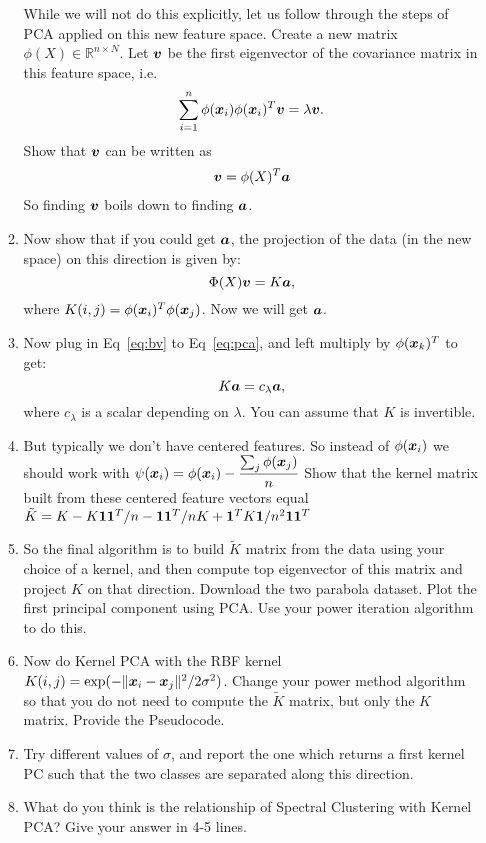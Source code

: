 \documentclass[11pt]{article}
\begin{document}
\begin{enumerate}
\begin{enumerate}
While we will not do this explicitly, let us follow through the steps of PCA applied on this new feature space. Create a new matrix $\phi(X)\in\mathbb{R}^{n\times N}$. Let $\boldsymbol{v}$ be the first eigenvector of the covariance matrix in this feature space, i.e.
\begin{align}
\label{eq:pca}
\sum_{i=1}^n\phi(\boldsymbol{x}_i)\phi(\boldsymbol{x}_i)^T\boldsymbol{v}=\lambda \boldsymbol{v}.
\end{align}
 Show that $\boldsymbol{v}$ can be written as 
\begin{align}\label{eq:bv}
\boldsymbol{v}=\phi(X)^T\boldsymbol{a}
\end{align}
So finding $\boldsymbol{v}$ boils down to finding $\boldsymbol{a}$. 
\item Now show that if you could get $\boldsymbol{a}$, the projection of the data (in the new space) on this direction is given by:
$$\Phi(X)\boldsymbol{v}=K\boldsymbol{a},$$
where $K(i,j)=\phi(\boldsymbol{x}_i)^T\phi(\boldsymbol{x}_j)$. Now we will get $\boldsymbol{a}$.
\item Now plug in Eq~\eqref{eq:bv} to Eq~\eqref{eq:pca}, and left multiply by $\phi(\boldsymbol{x}_k)^T$ to get:
$$K\boldsymbol{a}=c_\lambda \boldsymbol{a},$$
where $c_\lambda$ is a scalar depending on $\lambda$.
You can assume that $K$ is invertible.
\item But typically we don't have centered features. So instead of $\phi(\boldsymbol{x}_i)$ we should work with $\psi(\boldsymbol{x}_i)=\phi(\boldsymbol{x}_i)-\dfrac{\sum_j \phi(\boldsymbol{x}_j)}{n}$
Show that the kernel matrix built from these centered feature vectors equal $\tilde{K}=K-K\boldsymbol{1}\boldsymbol{1}^T/n-\boldsymbol{1}\boldsymbol{1}^T/nK+\boldsymbol{1}^TK\boldsymbol{1}/n^2\boldsymbol{1}\boldsymbol{1}^T$
\item So the final algorithm is to build $\tilde{K}$ matrix from the data using your choice of a kernel, and then compute top eigenvector of this matrix and project $K$ on that direction. Download the two parabola dataset. Plot the first principal component using PCA. Use your power iteration algorithm to do this.
\item Now do Kernel PCA with the RBF kernel $K(i,j)=\exp(-\|\boldsymbol{x}_i-\boldsymbol{x}_j\|^2/2\sigma^2)$. Change your power method algorithm so that you do not need to compute the $\tilde{K}$ matrix, but only the $K$ matrix. Provide the Pseudocode.
\item Try different values of $\sigma$, and report the one which returns a first kernel PC such that the two classes are separated along this direction.
\item What do you think is the relationship of Spectral Clustering with Kernel PCA? Give your answer in 4-5 lines.
\end{enumerate}
\end{enumerate}
\end{document}
